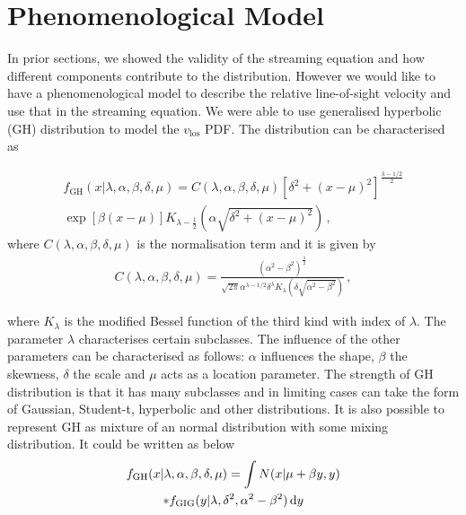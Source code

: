 \documentclass[a4paper,fleqn,usenatbib]{mnras}
\begin{document}
	\section{Phenomenological Model}

	In prior sections, we showed the validity of the streaming equation and how different components contribute to the distribution. However we would like to have a phenomenological model to describe the relative line-of-sight velocity and use that in the streaming equation. We were able to use generalised hyperbolic (GH) distribution to model the $v_{\mathrm{los}}$ PDF. The distribution can be characterised as
	
	\begin{multline}
		f_{\mathrm{GH}}(x|\lambda, \alpha,\beta,\delta,\mu) = C\left(\lambda, \alpha,\beta,\delta,\mu\right) \left[\delta^2+\left(x-\mu\right)^2\right]^{\frac{\lambda-1/2}{2}}  \\
		\exp\left[\beta\left(x-\mu\right)\right] K_{\lambda-\frac{1}{2}}\left(\alpha\sqrt{\delta^2+(x-\mu)^2}\right) \, ,
	\end{multline}
	\noindent where $C\left(\lambda, \alpha,\beta,\delta,\mu\right)$ is the normalisation term and it is given by
	\begin{eqnarray}
		C\left(\lambda, \alpha,\beta,\delta,\mu\right) = \frac{\left(\alpha^2-\beta^2\right)^{\frac{\lambda}{2}}}{\sqrt{2\pi}\alpha^{\lambda - 1/2}\delta^\lambda K_{\lambda}\left(\delta\sqrt{\alpha^2-\beta^2}\right)}  \, ,
	\end{eqnarray}
	
	\noindent where $K_{\lambda}$ is the modified Bessel function of the third kind with index of $\lambda$. The parameter $\lambda$ characterises certain subclasses. The influence of the other parameters can be characterised as follows: $\alpha$ influences the shape, $\beta$ the skewness, $\delta$ the scale and $\mu$ acts as a location parameter. The strength of GH distribution is that it has many subclasses and in limiting cases can take the form of Gaussian, Student-t, hyperbolic and other distributions. It is also possible to represent GH as mixture of an normal distribution with some mixing distribution. It could be written as below
	\begin{multline}
		f_{\mathrm{GH}}(x|\lambda, \alpha,\beta,\delta,\mu) = \int  N(x | \mu + \beta y, y) \\
		* f_{\mathrm{GIG}}(y | \lambda, \delta^2, \alpha^2-\beta^2) \dif y
	\end{multline}
	
\end{document}
